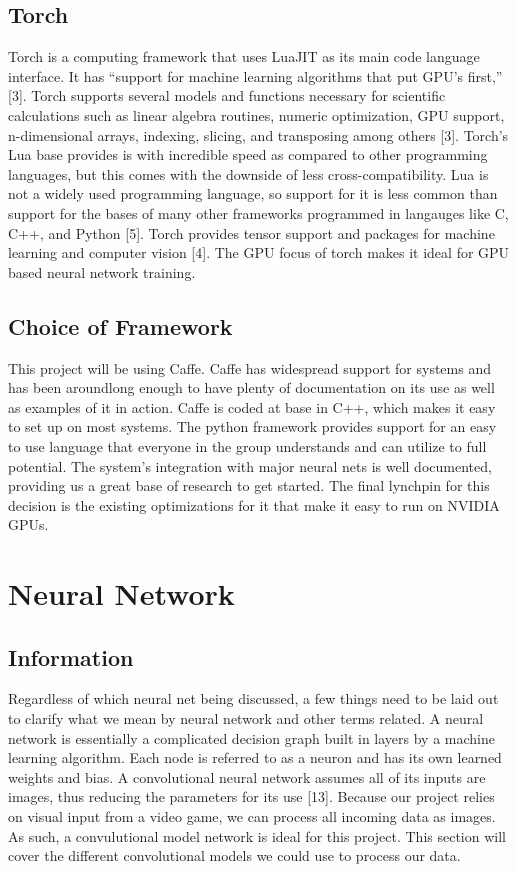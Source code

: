 \documentclass{scrreprt}
\begin{document}
\subsection{Torch}
Torch is a computing framework that uses LuaJIT as its main code language interface. 
It has “support for machine learning algorithms that put GPU’s first,” [3]. 
Torch supports several models and functions necessary for scientific calculations such as linear algebra routines, numeric optimization, GPU support, n-dimensional arrays, indexing, slicing, and transposing among others [3]. 
Torch’s Lua base provides is with incredible speed as compared to other programming languages, but this comes with the downside of less cross-compatibility. 
Lua is not a widely used programming language, so support for it is less common than support for the bases of many other frameworks programmed in langauges like C, C++, and Python [5]. 
Torch provides tensor support and packages for machine learning and computer vision [4]. 
The GPU focus of torch makes it ideal for GPU based neural network training.

\subsection{Choice of Framework}
This project will be using Caffe. 
Caffe has widespread support for systems and has been aroundlong enough to have plenty of documentation on its use as well as examples of it in action. 
Caffe is coded at base in C++, which makes it easy to set up on most systems. 
The python framework provides support for an easy to use language that everyone in the group understands and can utilize to full potential. 
The system's integration with major neural nets is well documented, providing us a great base of research to get started. 
The final lynchpin for this decision is the existing optimizations for it that make it easy to run on NVIDIA GPUs.

\section{Neural Network}

\subsection{Information}
Regardless of which neural net being discussed, a few things need to be laid out to clarify what we mean by neural network and other terms related. 
A neural network is essentially a complicated decision graph built in layers by a machine learning algorithm. 
Each node is referred to as a neuron and has its own learned weights and bias. 
A convolutional neural network assumes all of its inputs are images, thus reducing the parameters for its use [13]. 
Because our project relies on visual input from a video game, we can process all incoming data as images.
As such, a convulutional model network is ideal for this project.
This section will cover the different convolutional models we could use to process our data.
\end{document}
